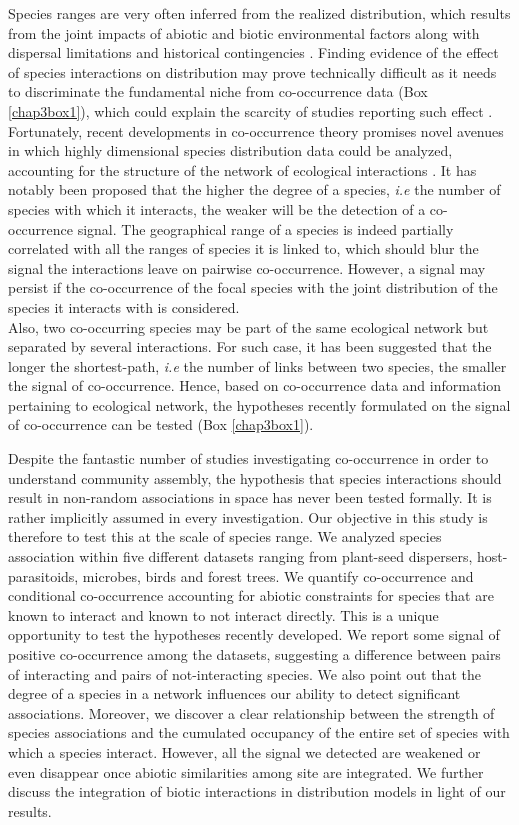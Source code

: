 Species ranges are very often inferred from the realized distribution,
which results from the joint impacts of abiotic and biotic environmental
factors along with dispersal limitations and historical contingencies
\citep{Pulliam2000, Holt2009, Godsoe2010a, Araujo2014}. Finding evidence
of the effect of species interactions on distribution may prove
technically difficult as it needs to discriminate the fundamental niche
from co-occurrence data (Box \ref{chap3box1}), which could explain the
scarcity of studies reporting such effect \citep[but
see][]{Gotelli2010}. Fortunately, recent developments in co-occurrence
theory promises novel avenues in which highly dimensional species
distribution data could be analyzed, accounting for the structure of the
network of ecological interactions \citep{Cazelles2016}. It has notably
been proposed that the higher the degree of a species, \emph{i.e} the
number of species with which it interacts, the weaker will be the
detection of a co-occurrence signal. The geographical range of a species
is indeed partially correlated with all the ranges of species it is
linked to, which should blur the signal the interactions leave on
pairwise co-occurrence. However, a signal may persist if the
co-occurrence of the focal species with the joint distribution of the
species it interacts with is considered.\\
Also, two co-occurring species may be part of the same ecological
network but separated by several interactions. For such case, it has
been suggested that the longer the shortest-path, \emph{i.e} the number
of links between two species, the smaller the signal of co-occurrence.
Hence, based on co-occurrence data and information pertaining to
ecological network, the hypotheses recently formulated on the signal of
co-occurrence can be tested (Box \ref{chap3box1}).

Despite the fantastic number of studies investigating co-occurrence in
order to understand community assembly, the hypothesis that species
interactions should result in non-random associations in space has never
been tested formally. It is rather implicitly assumed in every
investigation. Our objective in this study is therefore to test this at
the scale of species range. We analyzed species association within five
different datasets ranging from plant-seed dispersers, host-parasitoids,
microbes, birds and forest trees. We quantify co-occurrence and
conditional co-occurrence accounting for abiotic constraints for species
that are known to interact and known to not interact directly. This is a
unique opportunity to test the hypotheses recently developed. We report
some signal of positive co-occurrence among the datasets, suggesting a
difference between pairs of interacting and pairs of not-interacting
species. We also point out that the degree of a species in a network
influences our ability to detect significant associations. Moreover, we
discover a clear relationship between the strength of species
associations and the cumulated occupancy of the entire set of species
with which a species interact. However, all the signal we detected are
weakened or even disappear once abiotic similarities among site are
integrated. We further discuss the integration of biotic interactions in
distribution models in light of our results.

